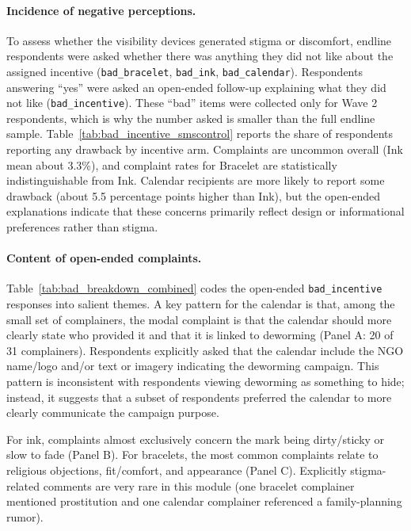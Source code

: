 \documentclass[12pt,a4paper]{article}
\begin{document}
\paragraph{Incidence of negative perceptions.}
To assess whether the visibility devices generated stigma or discomfort, endline respondents were asked whether there was anything they did not like about the assigned incentive (\texttt{bad\_bracelet}, \texttt{bad\_ink}, \texttt{bad\_calendar}). Respondents answering ``yes'' were asked an open-ended follow-up explaining what they did not like (\texttt{bad\_incentive}). These ``bad'' items were collected only for Wave 2 respondents, which is why the number asked is smaller than the full endline sample. Table~\ref{tab:bad_incentive_smscontrol} reports the share of respondents reporting any drawback by incentive arm. Complaints are uncommon overall (Ink mean about 3.3\%), and complaint rates for Bracelet are statistically indistinguishable from Ink. Calendar recipients are more likely to report some drawback (about 5.5 percentage points higher than Ink), but the open-ended explanations indicate that these concerns primarily reflect design or informational preferences rather than stigma.

\paragraph{Content of open-ended complaints.}
Table~\ref{tab:bad_breakdown_combined} codes the open-ended \texttt{bad\_incentive} responses into salient themes. A key pattern for the calendar is that, among the small set of complainers, the modal complaint is that the calendar should more clearly state who provided it and that it is linked to deworming (Panel A: 20 of 31 complainers). Respondents explicitly asked that the calendar include the NGO name/logo and/or text or imagery indicating the deworming campaign. This pattern is inconsistent with respondents viewing deworming as something to hide; instead, it suggests that a subset of respondents preferred the calendar to more clearly communicate the campaign purpose.

For ink, complaints almost exclusively concern the mark being dirty/sticky or slow to fade (Panel B). For bracelets, the most common complaints relate to religious objections, fit/comfort, and appearance (Panel C). Explicitly stigma-related comments are very rare in this module (one bracelet complainer mentioned prostitution and one calendar complainer referenced a family-planning rumor).
\end{document}

